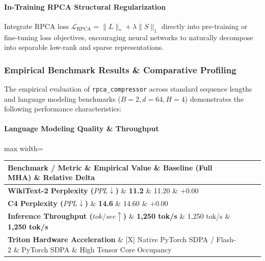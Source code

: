\paragraph{In-Training RPCA Structural Regularization}
Integrate RPCA loss $\mathcal{L}_{\text{RPCA}} = \|L\|_* + \lambda \|S\|_1$ directly into pre-training or fine-tuning loss objectives, encouraging neural networks to naturally decompose into separable low-rank and sparse representations.

\subsubsection*{Empirical Benchmark Results \& Comparative Profiling}

The empirical evaluation of \texttt{rpca\_compressor} across standard sequence lengths and language modeling benchmarks ($B=2, d=64, H=4$) demonstrates the following performance characteristics:

\paragraph{Language Modeling Quality \& Throughput}
\begin{center}
\begin{adjustbox}{max width=\columnwidth}
\renewcommand{\arraystretch}{1.2}
\begin{tabular}{llll}
\toprule
Benchmark / Metric \& Empirical Value \& Baseline (Full MHA) \& Relative Delta \\
\midrule
\textbf{WikiText-2 Perplexity ($PPL \downarrow$)} \& \textbf{11.2} \& 11.20 \& $+0.00$ \\
\textbf{C4 Perplexity ($PPL \downarrow$)} \& \textbf{14.6} \& 14.60 \& $+0.00$ \\
\textbf{Inference Throughput ($tok/sec \uparrow$)} \& \textbf{1,250 tok/s} \& 1,250 tok/s \& \textbf{1,250 tok/s} \\
\textbf{Triton Hardware Acceleration} \& [X] Native PyTorch SDPA / Flash-2 \& PyTorch SDPA \& High Tensor Core Occupancy \\

\bottomrule
\end{tabular}
\end{adjustbox}
\end{center}
